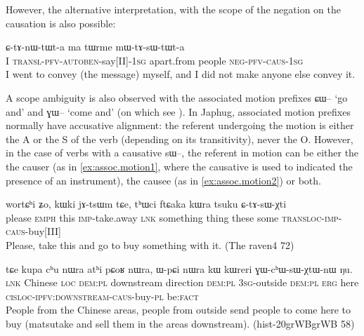 \documentclass[oldfontcommands,oneside,a4paper,11pt]{article}
\newcommand{\ipa}[1]{{\phon \mbox{#1}}} %
\newcommand{\sg}{\textsc{sg}}
\newcommand{\wav}[1]{}%
\newcommand{\pfv}{\textsc{pfv}}
\newcommand{\auto}{\textsc{autoben}}
\newcommand{\caus}{\textsc{caus}}
\newcommand{\negat}{\textsc{neg}}
\newcommand{\transloc}{\textsc{transl}}
\begin{document}
  However, the alternative interpretation, with the scope of the negation on the causation is also possible:

  \begin{exe}
\ex
\gll \ipa{aʑo} 	\ipa{ɕ-tɤ-nɯ-tɯt-a} 	\ipa{ma} 	\ipa{tɯrme} 	\ipa{mɯ-tɤ-sɯ-tɯt-a} \\
I \transloc{}-\pfv{}-\auto{}-say[II]-1\sg{} apart.from people \negat{}-\pfv{}-\caus{}-1\sg{} \\
  \glt    I went to convey (the message) myself,  and I did not make anyone else convey it. \wav{8_mWtAsWtWta}
  \end{exe} 
 
A scope ambiguity is also observed with the associated motion prefixes \ipa{ɕɯ--} `go and' and  \ipa{ɣɯ--} `come and' (on which see \citealt{jacques13harmonization}). In Japhug, associated motion prefixes normally have accusative alignment: the referent undergoing the motion is either the A or the S of the verb (depending on its transitivity), never the O. However, in the case of verbs with a causative \ipa{sɯ--}, the referent in motion can be either the  the causer (as in \ref{ex:assoc.motion1}, where the causative is used to indicated the presence of an instrument), the causee (as in \ref{ex:assoc.motion2}) or both.


  \begin{exe}
\ex \label{ex:assoc.motion1}
\gll
\ipa{wortɕʰi} 	\ipa{ʑo,} 	\ipa{kɯki} 	\ipa{jɤ-tsɯm} 	\ipa{tɕe,} 	\ipa{tʰɯci} 	\ipa{ftɕaka} 	\ipa{kɯra} 	\ipa{tsuku} 	\ipa{ɕ-tɤ-sɯ-χti} \\
please \textsc{emph} this \textsc{imp}-take.away \textsc{lnk} something thing these some \textsc{transloc-imp-caus}-buy[III] \\
\glt Please, take this and go to buy something with it. (The raven4 72)
  \end{exe} 


  \begin{exe}
\ex \label{ex:assoc.motion2}
\gll
\ipa{tɕe} 	\ipa{kupa} 	\ipa{cʰu} 	\ipa{nɯra} 	\ipa{atʰi} 	\ipa{pɕoʁ} 	\ipa{nɯra,} 	\ipa{ɯ-pɕi} 	\ipa{nɯra} 	\ipa{kɯ} 	\ipa{kɯreri} 	\ipa{ɣɯ-cʰɯ-sɯ-χtɯ-nɯ} 	\ipa{ŋu.}  \\
\textsc{lnk} Chinese \textsc{loc} \textsc{dem:pl} downstream direction \textsc{dem:pl} \textsc{3sg}-outside  \textsc{dem:pl}  \textsc{erg} here \textsc{cisloc-ipfv:downstream-caus}-buy-\textsc{pl} be\textsc{:fact} \\
\glt People from the Chinese areas, people from outside send people to come here to buy (matsutake and sell them in the areas downstream). (hist-20grWBgrWB 58)
  \end{exe} 
\end{document}
